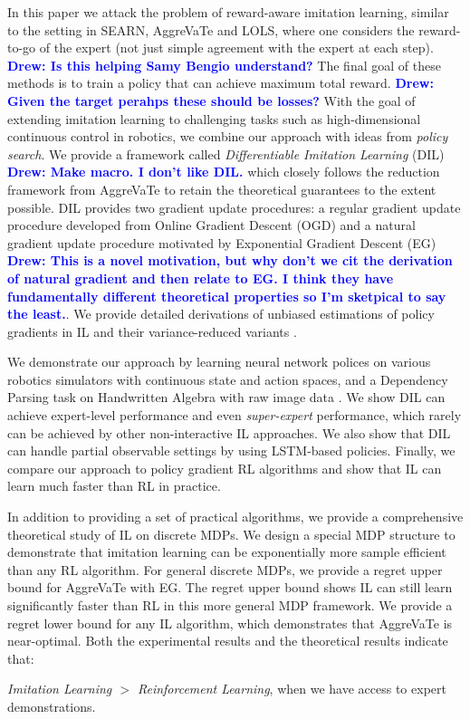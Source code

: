 \documentclass{article}
\newcommand{\drew}[1]{\textcolor{blue}{\bf Drew: {#1}}}
\begin{document}
In this paper we attack the problem of reward-aware imitation learning, similar to the setting in SEARN, AggreVaTe and LOLS, where one considers the reward-to-go of the expert (not just  simple agreement with the expert at each step). \drew{Is this helping Samy Bengio understand?} The final goal of these methods is to train a policy that can achieve maximum total reward. \drew{Given the target perahps these should be losses?}
With the goal of extending imitation learning to challenging tasks such as high-dimensional continuous control in robotics, we combine our approach with ideas from \emph{policy search}. We provide a framework called \emph{Differentiable  Imitation Learning} (DIL) \drew{Make macro. I don't like DIL.} which closely follows the reduction framework from AggreVaTe \cite{ross2014reinforcement} to retain the theoretical guarantees to the extent possible. DIL provides two gradient update procedures: a regular gradient update procedure developed from Online Gradient Descent (OGD) \cite{Zinkevich2003_ICML} and a natural gradient update procedure motivated by Exponential Gradient Descent (EG) \cite{shalev2012online} \drew{This is a novel motivation, but why don't we cit the derivation of natural gradient and then relate to EG. I think they have fundamentally different theoretical properties so I'm sketpical to say the least.}. We provide detailed derivations of unbiased estimations of policy gradients in IL and their variance-reduced variants \cite{greensmith2004variance}. 

We demonstrate our approach by learning neural network polices on various robotics simulators with continuous state and action spaces, and a Dependency Parsing task on Handwritten Algebra with raw image data \cite{duyckpredicting}. We show DIL can achieve expert-level performance and even \emph{super-expert} performance, which rarely can be achieved by other non-interactive IL approaches. We also show that DIL can handle partial observable settings by using LSTM-based policies. Finally, we compare our approach to policy gradient RL algorithms and show that IL can learn much faster than RL in practice. 

In addition to providing a set of practical algorithms, we provide a comprehensive  theoretical study of IL on discrete MDPs. We design a special MDP structure to demonstrate that imitation learning can be exponentially more sample efficient than any RL algorithm. For general discrete MDPs, we provide a regret upper bound for AggreVaTe with EG. The regret upper bound shows IL can still learn significantly faster than RL in this more general MDP framework. We provide a regret lower bound for any IL algorithm, which demonstrates that AggreVaTe is near-optimal. Both the experimental results and the theoretical results indicate that: 
\begin{displayquote}
\emph{Imitation Learning $>$ Reinforcement Learning}, when we have access to expert demonstrations.
\end{displayquote}
\end{document}
